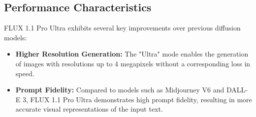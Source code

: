 \subsection{Performance Characteristics}
FLUX 1.1 Pro Ultra exhibits several key improvements over previous diffusion models:

\begin{itemize}
    \item \textbf{Higher Resolution Generation:} The "Ultra" mode enables the generation of images with resolutions up to 4 megapixels without a corresponding loss in speed.
    \item \textbf{Prompt Fidelity:} Compared to models such as Midjourney V6 and DALL-E 3, FLUX 1.1 Pro Ultra demonstrates high prompt fidelity, resulting in more accurate visual representations of the input text.
\end{itemize}